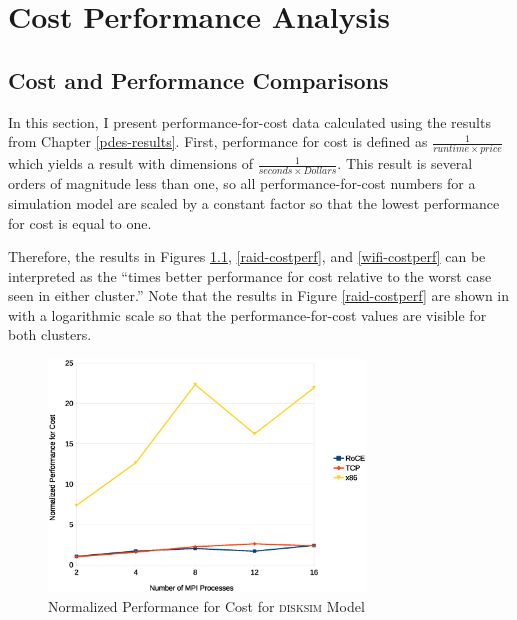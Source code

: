 \documentclass[11pt]{book}
\begin{document}
\chapter{Cost Performance Analysis}\label{analysis}

\section{Cost and Performance Comparisons}

In this section, I present performance-for-cost data calculated using the
results from Chapter \ref{pdes-results}. First, performance for cost is
defined as $\frac{1}{runtime \times price}$ which yields a result with
dimensions of $\frac{1}{seconds \times Dollars}$. This result is several orders
of magnitude less than one, so all performance-for-cost numbers for a simulation
model are scaled by a constant factor so that the lowest performance for cost is
equal to one.

Therefore, the results in Figures \ref{disksim-costperf},
  \ref{raid-costperf}, and \ref{wifi-costperf} can be interpreted as
the ``times better performance for cost relative to the worst case seen in
either cluster.'' Note that the results in Figure \ref{raid-costperf}
are shown in with a logarithmic scale so that the performance-for-cost values are
visible for both clusters.

\begin{figure}
\centering
\includegraphics[width=0.75\textwidth]{disksim_costperf}
\caption{Normalized Performance for Cost for \textsc{disksim} Model}
\label{disksim-costperf}
\end{figure}
\end{document}
